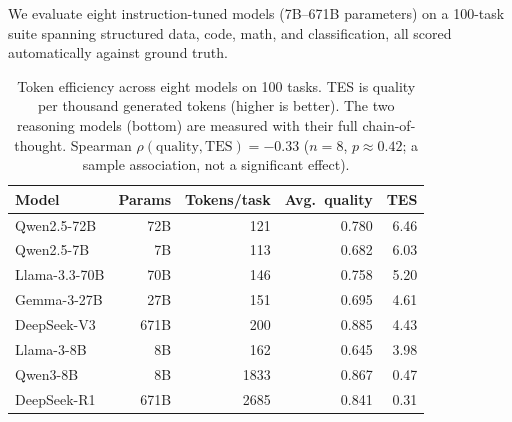 \documentclass[12pt]{article}
\begin{document}
We evaluate eight instruction-tuned models (7B--671B parameters) on a 100-task suite spanning structured data, code, math, and classification, all scored automatically against ground truth.

\begin{table}[H]
\centering\small
\begin{tabular}{lrrrr}
\toprule
\textbf{Model} & \textbf{Params} & \textbf{Tokens/task} & \textbf{Avg.\ quality} & \textbf{TES}\\
\midrule
Qwen2.5-72B   &  72B & 121 & 0.780 & 6.46\\
Qwen2.5-7B    &   7B & 113 & 0.682 & 6.03\\
Llama-3.3-70B &  70B & 146 & 0.758 & 5.20\\
Gemma-3-27B   &  27B & 151 & 0.695 & 4.61\\
DeepSeek-V3   & 671B & 200 & 0.885 & 4.43\\
Llama-3-8B    &   8B & 162 & 0.645 & 3.98\\
Qwen3-8B      &   8B & 1833 & 0.867 & 0.47\\
DeepSeek-R1   & 671B & 2685 & 0.841 & 0.31\\
\bottomrule
\end{tabular}
\caption{Token efficiency across eight models on 100 tasks. TES is quality per thousand generated tokens (higher is better). The two reasoning models (bottom) are measured with their full chain-of-thought. Spearman $\rho(\text{quality}, \text{TES}) = -0.33$ ($n=8$, $p \approx 0.42$; a sample association, not a significant effect).}
\label{tab:tes}
\end{table}
\end{document}
